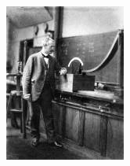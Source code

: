 \documentclass[12pt,a4paper,titlepage,final]{report}
\begin{document}
\begin{figure}[!htb]
	\centering
	\begin{subfigure}[b]{0.4\textwidth}
 		\includegraphics[width=\textwidth]{Otto_Wiener}
	\end{subfigure}
	~ %
	\begin{subfigure}[b]{0.4\textwidth}

\end{subfigure}
\end{figure}
\end{document}
